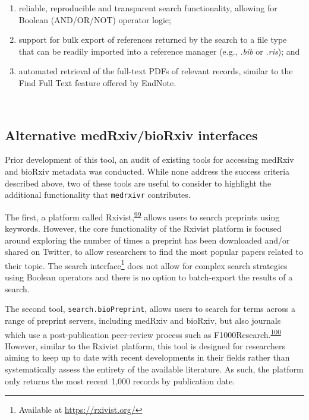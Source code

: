 \documentclass[a4paper, twoside]{templates/ociamthesis}
\begin{document}
\begin{enumerate}
\def\labelenumi{\arabic{enumi}.}
\item
  reliable, reproducible and transparent search functionality, allowing for Boolean (AND/OR/NOT) operator logic;
\item
  support for bulk export of references returned by the search to a file type that can be readily imported into a reference manager (e.g., \emph{.bib} or \emph{.ris}); and
\item
  automated retrieval of the full-text PDFs of relevant records, similar to the Find Full Text feature offered by EndNote.
\end{enumerate}

~

\hypertarget{alternative-medrxivbiorxiv-interfaces}{%
\subsection{Alternative medRxiv/bioRxiv interfaces}\label{alternative-medrxivbiorxiv-interfaces}}

Prior development of this tool, an audit of existing tools for accessing medRxiv and bioRxiv metadata was conducted. While none address the success criteria described above, two of these tools are useful to consider to highlight the additional functionality that \texttt{medrxivr} contributes.

The first, a platform called Rxivist,\textsuperscript{\protect\hyperlink{ref-abdill2019}{99}} allows users to search preprints using keywords. However, the core functionality of the Rxivist platform is focused around exploring the number of times a preprint has been downloaded and/or shared on Twitter, to allow researchers to find the most popular papers related to their topic. The search interface\footnote{Available at \url{https://rxivist.org/}} does not allow for complex search strategies using Boolean operators and there is no option to batch-export the results of a search.

The second tool, \texttt{search.bioPreprint}, allows users to search for terms across a range of preprint servers, including medRxiv and bioRxiv, but also journals which use a post-publication peer-review process such as F1000Research.\textsuperscript{\protect\hyperlink{ref-iwema2016}{100}} However, similar to the Rxivist platform, this tool is designed for researchers aiming to keep up to date with recent developments in their fields rather than systematically assess the entirety of the available literature. As such, the platform only returns the most recent 1,000 records by publication date.
\end{document}
